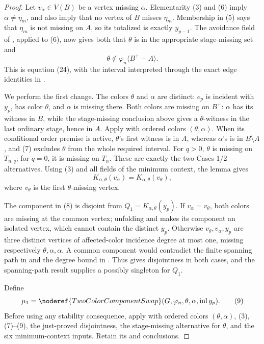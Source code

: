\begin{proof}
Let \(v_\alpha\in V(B)\) be a vertex missing \(\alpha\).  Elementarity
(3) and (6) imply \(\alpha\ne\eta_m\), and also imply that no vertex of
\(B\) misses \(\eta_m\).  Membership in (5) says that \(\eta_m\) is not
missing on \(A\), so its totalized
 is exactly \(y_{p-1}\).  The
avoidance field of , applied to (6), now gives
both that \(\theta\) is in the appropriate stage-missing set and
\[
       \theta\notin\varphi_n\langle B^+-A\rangle .           \tag{7}
\]
This is equation (24), with the interval interpreted through the exact
edge identities in .

We perform the first change.  The colors \(\theta\) and \(\alpha\) are
distinct: \(e_p\) is incident with \(y_p\), has color \(\theta\), and
\(\alpha\) is missing there.  Both colors are missing on \(B^+\):
\(\alpha\) has its witness in \(B\), while the stage-missing conclusion
above gives a \(\theta\)-witness in the last ordinary stage, hence in
\(A\).  Apply  with ordered colors
\((\theta,\alpha)\).  When its conditional order premise is active,
\(\theta\)'s first witness is in \(A\), whereas \(\alpha\)'s is in
\(B\setminus A\), and (7) excludes \(\theta\) from the whole required
interval.  For \(q>0\), \(\theta\) is missing on \(T_{n,q}\); for
\(q=0\), it is missing on \(T_n\).  These are exactly the two Cases 1/2
alternatives.  Using (3) and all fields of the minimum context, the lemma
gives
\[
 K_{\alpha,\theta}(v_\alpha)
       =K_{\alpha,\theta}(v_\theta),                         \tag{8}
\]
where \(v_\theta\) is the first \(\theta\)-missing vertex.

The component in (8) is disjoint from
\(Q_1=K_{\alpha,\theta}(y_p)\).  If
\(v_\alpha=v_\theta\), both colors are missing at the common vertex;
unfolding  and
 makes its component an isolated vertex,
which cannot contain the distinct \(y_p\).  Otherwise
\(v_\theta,v_\alpha,y_p\) are three distinct vertices of affected-color
incidence degree at most one, missing respectively
\(\theta,\alpha,\alpha\).  A common component would contradict the
finite spanning path in  and the
degree bound in .  Thus
 gives disjointness in both cases,
and the spanning-path result supplies a possibly singleton
 for \(Q_1\).

Define
\[
 \mu_1=\noderef{TwoColorComponentSwap}
       (G,\varphi_n,\theta,\alpha,\operatorname{inl}y_p).    \tag{9}
\]
Before using any stability consequence, apply
 with ordered colors
\((\theta,\alpha)\), (3), (7)--(9), the just-proved disjointness, the
stage-missing alternative for \(\theta\), and the six minimum-context
inputs.  Retain its  and
 conclusions.


\end{proof}
